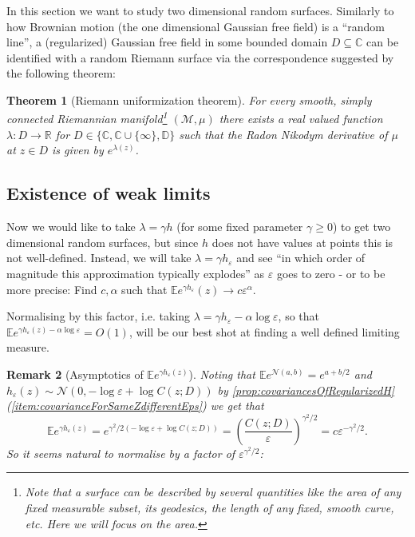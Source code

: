 \documentclass[11pt,reqno]{amsart}
\numberwithin{equation}{section}
\newtheorem{thm}{Theorem}[section]
\newtheorem{rem}[thm]{Remark}
\newcommand{\eps}{\varepsilon}
\begin{document}
In this section we want to study two dimensional random surfaces. Similarly to how Brownian motion (the one dimensional Gaussian free field) is a ``random line'', a (regularized) Gaussian free field in some bounded domain $D\subseteq\mathbb C$ can be identified with a random Riemann surface via the correspondence suggested by the following theorem:
\begin{thm}[Riemann uniformization theorem]
	For every smooth, simply connected Riemannian manifold\footnote{Note that a surface can be described by several quantities like the area of any fixed measurable subset, its geodesics, the length of any fixed, smooth curve, etc. Here we will focus on the area.} $(\mathcal M,\mu)$ there exists a real valued function $\lambda:D\rightarrow\mathbb R$ for $D\in\{\mathbb C,\mathbb C\cup\{\infty\},\mathbb D\}$ such that the Radon Nikodym derivative of $\mu$ at $z\in D$ is given by $e^{\lambda(z)}$.
\end{thm}

\subsection{Existence of weak limits}

Now we would like to take $\lambda = \gamma h$ (for some fixed parameter $\gamma\geq 0$) to get two dimensional random surfaces, but since $h$ does not have values at points this is not well-defined. Instead, we will take $\lambda = \gamma h_\eps$ and see ``in which order of magnitude this approximation typically explodes'' as $\eps$ goes to zero - or to be more precise: Find $c,\alpha$ such that $\mathbb E e^{\gamma h_\eps}(z) \rightarrow c\eps^\alpha$.

Normalising by this factor, i.e. taking $\lambda=\gamma h_\eps - \alpha\log\eps$, so that $\mathbb E e^{\gamma h_\eps(z) - \alpha\log\eps}=O(1)$, will be our best shot at finding a well defined limiting measure.

\begin{rem}[Asymptotics of $\mathbb E e^{\gamma h_\eps(z)}$]\label{rem:asymptoticsofregularizedGFF}
	Noting that $\mathbb E e^{\mathcal N(a,b)}=e^{a+b/2}$ and $h_\eps(z)\sim\mathcal N(0,-\log\eps+\log C(z;D))$ by \ref{prop:covariancesOfRegularizedH}(\ref{item:covarianceForSameZdifferentEps}) we get that $$\mathbb E e^{\gamma h_\eps(z)} = e^{\gamma^2/2(-\log\eps+\log C(z;D))}=\left(\frac{C(z;D)}{\eps}\right)^{\gamma^2/2} = c\eps^{-\gamma^2/2}.$$
	So it seems natural to normalise by a factor of $\eps^{\gamma^2/2}$:
\end{rem}
\end{document}
